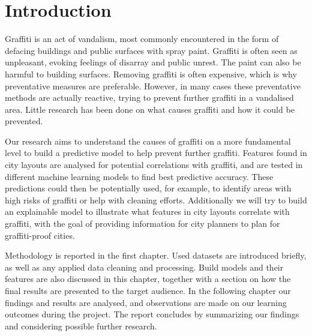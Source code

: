 \chapter{Introduction}


Graffiti is an act of vandalism, most commonly encountered in the form of defacing buildings and public surfaces with spray paint. Graffiti is often seen as unpleasant, evoking feelings of disarray and public unrest. The paint can also be harmful to building surfaces. Removing graffiti is often expensive, which is why preventative measures are preferable. However, in many cases these preventative methods are actually reactive, trying to prevent further graffiti in a vandalised area. Little research has been done on what causes graffiti and how it could be prevented.

Our research aims to understand the causes of graffiti on a more fundamental level to build a predictive model to help prevent further graffiti. Features found in city layouts are analysed for potential correlations with graffiti, and are tested in different machine learning models to find best predictive accuracy. These predictions could then be potentially used, for example, to identify areas with high risks of graffiti or help with cleaning efforts. Additionally we will try to build an explainable model to illustrate what features in city layouts correlate with graffiti, with the goal of providing information for city planners to plan for graffiti-proof cities. 

Methodology is reported in the first chapter. Used datasets are introduced briefly, as well as any applied data cleaning and processing. Build models and their features are also discussed in this chapter, together with a section on how the final results are presented to the target audience. In the following chapter our findings and results are analysed, and observations are made on our learning outcomes during the project. The report concludes by summarizing our findings and considering possible further research.